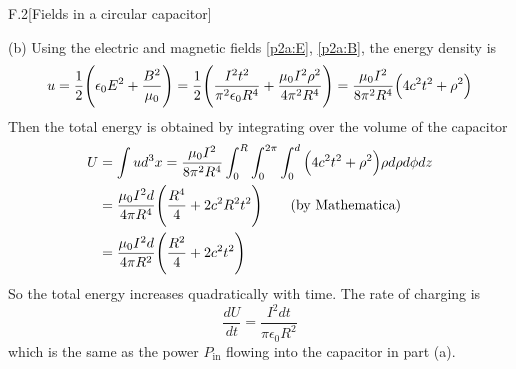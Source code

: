 \documentclass[12pt]{article}
\begin{document}
\begin{problem}{F.2}[Fields in a circular capacitor]
\begin{solution}
(b) Using the electric and magnetic fields \eqref{p2a:E}, \eqref{p2a:B}, the  
energy density is
\begin{equation}
    u=\frac12\qty(\epsilon_0E^2+\frac{B^2}{\mu_0}) 
    =\frac12\qty(\frac{I^2t^2}{\pi^2\epsilon_0R^4}+\frac{\mu_0I^2\rho^2}{4\pi^2R^4})
    =\frac{\mu_0I^2}{8\pi^2R^4}\qty(4c^2t^2+\rho^2)
\end{equation}
Then the total energy is obtained by integrating over the volume of the
capacitor
\begin{align}
    U&=\int
    ud^3x=\frac{\mu_0I^2}{8\pi^2R^4}\int_0^R\int_0^{2\pi}\int_0^d
    \qty(4c^2t^2+\rho^2)\rho d\rho d\phi dz\notag\\
     &=\frac{\mu_0I^2d}{4\pi R^4}\qty(\frac{R^4}{4}+2c^2R^2t^2)\tag{by
     Mathematica}\\
     &=\frac{\mu_0I^2d}{4\pi R^2}\qty(\frac{R^2}{4}+2c^2t^2)
\end{align}
So the total energy increases quadratically with time. The rate of charging is
\begin{equation}
    \frac{dU}{dt}=\frac{I^2dt}{\pi\epsilon_0 R^2} 
\end{equation}
which is the same as the power $P_\text{in}$ flowing into the capacitor in part 
(a).
\end{solution}
\end{problem}
\end{document}
